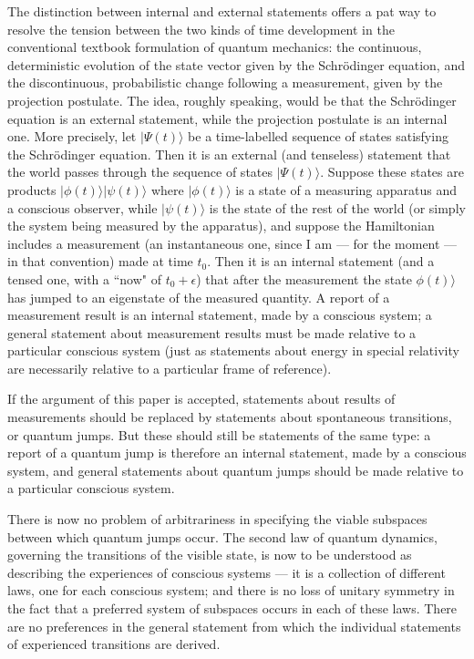 \documentclass[12pt,a4paper,reqno]{article}
\renewcommand{\(}{\left(}
\renewcommand{\)}{\right)}
\newcommand{\<}{\langle}
\renewcommand{\>}{\rangle}
\theoremstyle{plain} %
\theoremstyle{definition}
\theoremstyle{remark}
\begin{document}
The distinction between internal and external statements offers a pat
way to resolve the tension between the two kinds of time development in
the conventional textbook formulation of quantum mechanics: the
continuous, deterministic evolution of the state vector given by the
Schr\"odinger equation, and the discontinuous, probabilistic change
following a measurement, given by the projection postulate. The idea,
roughly speaking, would be that the Schr\"odinger equation is an
external statement, while the projection postulate is an internal one.
More precisely, let $|\Psi(t)\>$ be a time-labelled sequence of states
satisfying the Schr\"odinger equation. Then it is an external (and
tenseless) statement that the world passes through the sequence of
states $|\Psi (t)\>$. Suppose these states are products
$|\phi(t)\>|\psi(t)\>$ where $|\phi(t)\>$ is a state of a measuring apparatus and
a conscious observer, while $|\psi(t)\>$ is the state of the rest of the
world (or simply the system being measured by the apparatus), and
suppose the Hamiltonian includes a measurement (an instantaneous one, since I
am --- for the moment --- in that convention) made at time $t_0$. Then
it is an internal statement (and a tensed one, with a ``now" of $t_0 +
\epsilon$) that after the measurement the state $\phi(t)\>$ has jumped
to an eigenstate of the measured quantity. A report of a measurement
result is an internal statement, made by a conscious system; a general
statement about measurement results must be made relative to a
particular conscious system (just as statements about energy in special
relativity are necessarily relative to a particular frame of reference).

If the argument of this paper is accepted, statements about results
of measurements should be replaced by statements about spontaneous
transitions, or quantum jumps. But these should still be statements of the
same type: a report of a quantum jump is therefore an internal
statement, made by a conscious system, and general statements about
quantum jumps should be made relative to a particular conscious system. 

There is now no problem of arbitrariness in specifying the viable
subspaces between which quantum jumps occur. The second law of quantum
dynamics, governing the transitions of the visible state, is now to be
understood as describing the experiences of conscious systems
--- it is a collection of different laws, one for each conscious system;
and there is no loss of unitary symmetry in the fact that a preferred
system of subspaces occurs in each of these laws. There are no
preferences in the general statement from which the individual
statements of experienced transitions are derived.
\end{document}
